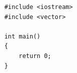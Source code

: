 \begin{lstlisting}
	#include <iostream>
	#include <vector>
	
	int main()
	{
		return 0;
	}
\end{lstlisting}

\label{ranges}



